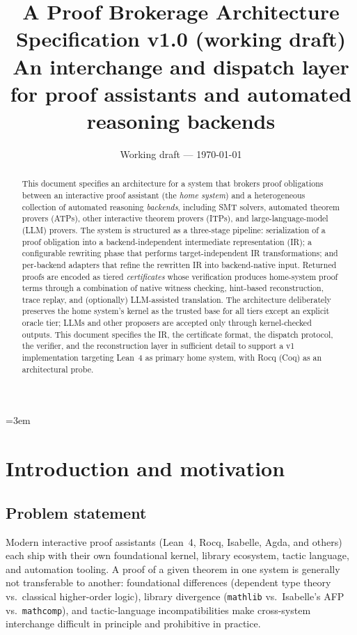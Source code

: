 \documentclass[11pt,letterpaper]{article}
\title{
  \vspace{-1cm}
  \textbf{A Proof Brokerage Architecture}\\[0.3em]
  \large{Specification v1.0 (working draft)}\\[0.3em]
  \normalsize{An interchange and dispatch layer for proof assistants and automated reasoning backends}
}
\author{}
\date{Working draft — \today}
\theoremstyle{definition}
\theoremstyle{remark}
\begin{document}
\maketitle
\thispagestyle{empty}

\sloppy
\emergencystretch=3em

\begin{abstract}
\noindent
This document specifies an architecture for a system that brokers proof obligations
between an interactive proof assistant (the \emph{home system}) and a
heterogeneous collection of automated reasoning \emph{backends}, including SMT
solvers, automated theorem provers (ATPs), other interactive theorem provers
(ITPs), and large-language-model (LLM) provers. The system is structured as a
three-stage pipeline: serialization of a proof obligation into a backend-independent
intermediate representation (IR); a configurable rewriting phase that performs
target-independent IR transformations; and per-backend adapters that refine the
rewritten IR into backend-native input. Returned proofs are encoded as
tiered \emph{certificates} whose verification produces home-system proof terms
through a combination of native witness checking, hint-based reconstruction,
trace replay, and (optionally) LLM-assisted translation. The architecture
deliberately preserves the home system's kernel as the trusted base for all
tiers except an explicit oracle tier; LLMs and other proposers are accepted only
through kernel-checked outputs. This document specifies the IR, the certificate
format, the dispatch protocol, the verifier, and the reconstruction layer in
sufficient detail to support a v1 implementation targeting Lean~4 as primary
home system, with Rocq (Coq) as an architectural probe.
\end{abstract}

\tableofcontents
\newpage

\section{Introduction and motivation}
\label{sec:intro}

\subsection{Problem statement}

Modern interactive proof assistants (Lean~4, Rocq, Isabelle, Agda, and others)
each ship with their own foundational kernel, library ecosystem, tactic
language, and automation tooling. A proof of a given theorem in one system
is generally not transferable to another: foundational differences (dependent
type theory vs.\ classical higher-order logic), library divergence
(\texttt{mathlib} vs.\ Isabelle's AFP vs.\ \texttt{mathcomp}), and tactic-language
incompatibilities make cross-system interchange difficult in principle and
prohibitive in practice.
\end{document}
